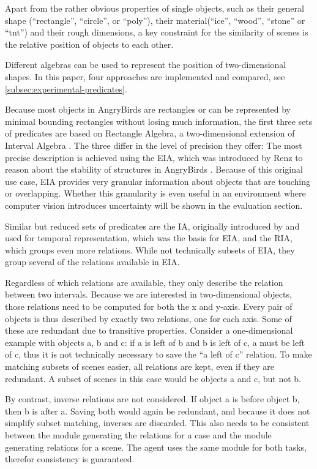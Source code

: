 Apart from the rather obvious properties of single objects, such as their general shape (``rectangle'', ``circle'', or ``poly''), their material(``ice'', ``wood'', ``stone'' or ``tnt'') and their rough dimensions, a key constraint for the similarity of scenes is the relative position of objects to each other.

Different algebras can be used to represent the position of two-dimensional shapes. In this paper, four approaches are implemented and compared, see \ref{subsec:experimental-predicates}.

Because most objects in AngryBirds are rectangles or can be represented by minimal bounding rectangles without losing much information, the first three sets of predicates are based on Rectangle Algebra, a two-dimensional extension of Interval Algebra \cite{Balbiani1999ANT}. The three differ in the level of precision they offer:
The most precise description is achieved using the \ac{EIA}, which was introduced by Renz to reason about the stability of structures in AngryBirds \cite{Renz-ERA}. Because of this original use case, \ac{EIA} provides very granular information about objects that are touching or overlapping.
Whether this granularity is even useful in an environment where computer vision introduces uncertainty will be shown in the evaluation section.

Similar but reduced sets of predicates are the \ac{IA}, originally introduced by \cite{Allen-10.1145/182.358434} and used for temporal representation, which was the basis for \ac{EIA}, and the \ac{RIA}, which groups even more relations. While not technically subsets of EIA, they group several of the relations available in EIA.



Regardless of which relations are available, they only describe the relation between two intervals. Because we are interested in two-dimensional objects, those relations need to be computed for both the x and y-axis. Every pair of objects is thus described by exactly two relations, one for each axis. Some of these are redundant due to transitive properties.
Consider a one-dimensional example with objects a, b and c: if a is left of b and b is left of c, a must be left of c, thus it is not technically necessary to save the ``a left of c''  relation.
To make matching subsets of scenes easier, all relations are kept, even if they are redundant. A subset of scenes in this case would be objects a and c, but not b.

By contrast, inverse relations are not considered. If object a is before object b, then b is after a. Saving both would again be redundant, and because it does not simplify subset matching, inverses are discarded. This also needs to be consistent between the module generating the relations for a case and the module generating relations for a scene. The agent uses the same module for both tasks, therefor consistency is guaranteed.

